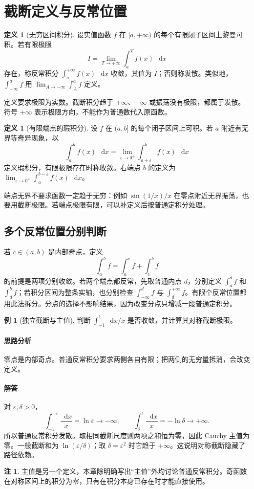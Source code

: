 \documentclass[UTF8,fontset=fandol,12pt,oneside,openany]{ctexrep}
\newcommand{\dd}{\mathop{}\!\mathrm d}
\theoremstyle{definition}
\newtheorem{definition}[theorem]{定义}
\newtheorem{example}{例}[chapter]
\newtheorem*{remark}{注}
\begin{document}
\section{截断定义与反常位置}
\label{lec:13:definition}
\begin{definition}[无穷区间积分]
设实值函数 $f$ 在 $[a,+\infty)$ 的每个有限闭子区间上黎曼可积。若有限极限
\[
I=\lim_{T\to+\infty}\int_a^T f(x)\,\dd x
\]
存在，称反常积分 $\int_a^{+\infty}f(x)\,\dd x$ 收敛，其值为 $I$；否则称发散。类似地，$\int_{-\infty}^a f$ 用 $\lim_{A\to-\infty}\int_A^a f$ 定义。
\end{definition}
定义要求极限为实数。截断积分趋于 $+\infty$、$-\infty$ 或振荡没有极限，都属于发散。符号 $+\infty$ 表示极限方向，不能作为普通数代入原函数。

\begin{definition}[有限端点的瑕积分]
设 $f$ 在 $(a,b]$ 的每个闭子区间上可积。若 $a$ 附近有无界等奇异现象，以
\[
\int_a^b f(x)\,\dd x
=\lim_{\varepsilon\to0^+}\int_{a+\varepsilon}^b f(x)\,\dd x
\]
定义瑕积分，有限极限存在时称收敛。右端点 $b$ 的定义为
$\lim_{\varepsilon\to0^+}\int_a^{b-\varepsilon}f(x)\,\dd x$。
\end{definition}
端点无界不要求函数一定趋于无穷：例如 $\sin(1/x)/x$ 在零点附近无界振荡，也要用截断极限。若端点极限有限，可以补定义后按普通定积分处理。

\subsection{多个反常位置分别判断}
若 $c\in(a,b)$ 是内部奇点，定义
\[
\int_a^b f=\int_a^c f+\int_c^b f
\]
的前提是两项分别收敛。若两个端点都反常，先取普通内点 $d$，分别定义 $\int_a^d f$ 和 $\int_d^b f$；若积分区间为整条实轴，也分别检查 $\int_{-\infty}^d f$ 与 $\int_d^{+\infty}f$。有限个反常位置都用此法拆分。分点的选择不影响结果，因为改变分点只增减一段普通定积分。

\begin{example}[独立截断与主值]
判断 $\int_{-1}^1\dd x/x$ 是否收敛，并计算其对称截断极限。
\end{example}
\paragraph{思路分析} 零点是内部奇点。普通反常积分要求两侧各自有限；把两侧的无穷量抵消，会改变定义。
\paragraph{解答} 对 $\varepsilon,\delta>0$，
\[
\int_{-1}^{-\varepsilon}\frac{\dd x}{x}=\ln\varepsilon\to-\infty,
\qquad
\int_\delta^1\frac{\dd x}{x}=-\ln\delta\to+\infty.
\]
所以普通反常积分发散。取相同截断尺度则两项之和恒为零，因此 Cauchy 主值为零。一般截断和为 $\ln(\varepsilon/\delta)$；取 $\delta=\varepsilon^2$ 时它趋于 $+\infty$。这说明对称截断隐藏了路径依赖。
\begin{remark}
主值是另一个定义，本章除明确写出“主值”外均讨论普通反常积分。奇函数在对称区间上的积分为零，只有在积分本身已存在时才能直接使用。
\end{remark}
\end{document}
